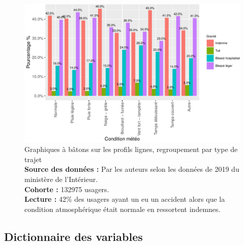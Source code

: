 \documentclass[french,]{tp}
\begin{document}
\begin{figure}[ht!]

{\centering \includegraphics{Prediction_Gravite_files/figure-latex/barplot3-1} 

}

\caption{Graphiques à bâtons sur les profils lignes, regroupement par type de trajet\\
\textbf{Source des données :} Par les auteurs selon les données de 2019 du ministère de l'Intérieur.\\
\textbf{Cohorte :} 132975 usagers.\\
\textbf{Lecture :} 42\% des usagers ayant un eu un accident alors que la condition atmosphérique était normale en ressortent indemnes.}\label{fig:barplot3}
\end{figure}
\newpage

\hypertarget{dictionnaire-des-variables}{%
\subsection{Dictionnaire des variables}\label{dictionnaire-des-variables}}
\end{document}
